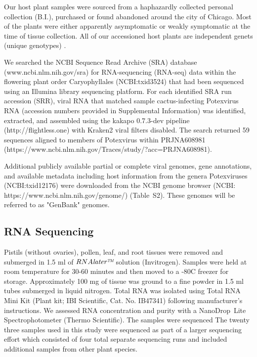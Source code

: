 \documentclass[fleqn,10pt,lineno]{wlpeerj}
\begin{document}
Our host plant samples were sourced from a haphazardly collected personal collection (B.I.), purchased or found abandoned around the city of Chicago. 
Most of the plants were either apparently asymptomatic or weakly symptomatic at the time of tissue collection.
All of our accessioned host plants are independent genets (unique genotypes) \citep{ramanauskas2021}.


We searched the NCBI Sequence Read Archive (SRA) database (www.ncbi.nlm.nih.gov/sra) for RNA-sequencing (RNA-seq) data within the flowering plant order Caryophyllales (NCBI:txid3524) that had been sequenced using an Illumina library sequencing platform. 
For each identified SRA run accession (SRR), viral RNA that matched sample cactus-infecting Potexvirus RNA (accession numbers provided in Supplemental Information) was identified, extracted, and assembled using the kakapo 0.7.3-dev pipeline (http://flightless.one) with Kraken2 viral filters disabled. 
The search returned 59 sequences aligned to members of Potexvirus within PRJNA608981 (https://www.ncbi.nlm.nih.gov/Traces/study/?acc=PRJNA608981).


Additional publicly available partial or complete viral genomes, gene annotations, and available metadata including host information from the genera Potexviruses (NCBI:txid12176) were downloaded from the NCBI genome browser (NCBI: https://www.ncbi.nlm.nih.gov/genome/) (Table~S2).
These genomes will be referred to as "GenBank" genomes.

\subsection*{RNA Sequencing}

Pistils (without ovaries), pollen, leaf, and root tissues were removed and submerged in 1.5 ml of $RNA\textit{later\texttrademark}$ solution (Invitrogen).
Samples were held at room temperature for 30-60 minutes and then moved to a -80\textdegree C freezer for storage.
Approximately 100 mg of tissue was ground to a fine powder in 1.5 ml tubes submerged in liquid nitrogen.
Total RNA was isolated using Total RNA Mini Kit (Plant kit; IBI Scientific, Cat. No. IB47341) following manufacturer's instructions.
We assessed RNA concentration and purity with a NanoDrop\texttrademark~Lite Spectrophotometer (Thermo Scientific).
The samples were sequenced
The twenty three samples used in this study were sequenced as part of a larger sequencing effort which consisted of four total separate sequencing runs and included additional samples from other plant species. 
\end{document}
